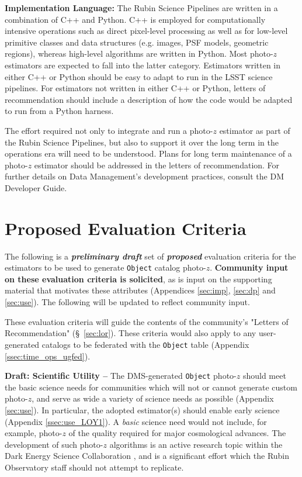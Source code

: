 \documentclass[DM,lsstdraft,toc]{lsstdoc}
\begin{document}
\textbf{Implementation Language:}
The Rubin Science Pipelines are written in a combination of C++ and Python. 
C++ is employed for computationally intensive operations such as direct pixel-level processing as well as for low-level primitive classes and data structures (e.g. images, PSF models, geometric regions), whereas high-level algorithms are written in Python. 
Most photo-$z$ estimators are expected to fall into the latter category.
Estimators written in either C++ or Python should be easy to adapt to run in the LSST science pipelines. 
For estimators not written in either C++ or Python, letters of recommendation should include a description of how the code would be adapted to run from a Python harness.

The effort required not only to integrate and run a photo-$z$ estimator as part of the Rubin Science Pipelines, but also to support it over the long term in the operations era will need to be understood. 
Plans for long term maintenance of a photo-$z$ estimator should be addressed in the letters of recommendation. 
For further details on Data Management's development practices, consult the DM Developer Guide. \cite{DevGuide} 

\section{Proposed Evaluation Criteria} \label{sec:eval}

The following is a \textbf{\textit{preliminary draft}} set of \textbf{\textit{proposed}} evaluation criteria for the estimators to be used to generate  {\tt Object} catalog photo-$z$.
\textbf{Community input on these evaluation criteria is solicited}, as is input on the supporting material that motivates these attributes (Appendices \ref{sec:imp}, \ref{sec:dp} and \ref{sec:use}).
The following will be updated to reflect community input.

These evaluation criteria will guide the contents of the community's "Letters of Recommendation" (\S~\ref{sec:lor}).
These criteria would also apply to any user-generated catalogs to be federated with the {\tt Object} table (Appendix \ref{ssec:time_ops_ugfed}).

{\bf Draft: Scientific Utility --}
The DMS-generated {\tt Object} photo-$z$ should meet the basic science needs for communities which will not or cannot generate custom photo-$z$, and serve as wide a variety of science needs as possible (Appendix \ref{sec:use}).
In particular, the adopted estimator(s) should enable early science (Appendix \ref{ssec:use_LOY1}).
A {\it basic} science need would not include, for example, photo-$z$ of the quality required for major cosmological advances.
The development of such photo-$z$ algorithms is an active research topic within the Dark Energy Science Collaboration \citep{2018arXiv180901669T}, and is a significant effort which the Rubin Observatory staff should not attempt to replicate. 
\end{document}
